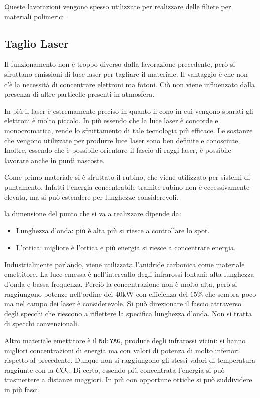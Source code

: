Queste lavorazioni vengono spesso utilizzate per realizzare delle filiere per materiali polimerici.

\subsection{Taglio Laser}
Il funzionamento non è troppo diverso dalla lavorazione precedente, però si sfruttano emissioni di luce laser per tagliare il materiale.
Il vantaggio è che non c'è la necessità di concentrare elettroni ma fotoni.
Ciò non viene influenzato dalla presenza di altre particelle presenti in atmosfera.

In più il laser è estremamente preciso in quanto il cono in cui vengono sparati gli elettroni è molto piccolo.
In più essendo che la luce laser è concorde e monocromatica, rende lo sfruttamento di tale tecnologia più efficace.
Le sostanze che vengono utilizzate per produrre luce laser sono ben definite e conosciute.
Inoltre, essendo che è possibile orientare il fascio di raggi laser, è possibile lavorare anche in punti nascoste.

Come primo materiale si è sfruttato il rubino, che viene utilizzato per sistemi di puntamento. Infatti l'energia concentrabile tramite rubino non è eccessivamente elevata, ma si può estendere per lunghezze considerevoli.

la dimensione del punto che si va a realizzare dipende da:
\begin{itemize}
\item Lunghezza d'onda: più è alta più si riesce a controllare lo spot.
\item L'ottica: migliore è l'ottica e più energia si riesce a concentrare energia.
\end{itemize}
Industrialmente parlando, viene utilizzata l'anidride carbonica come materiale emettitore. La luce emessa è nell'intervallo degli infrarossi lontani: alta lunghezza d'onda e bassa frequenza.
Perciò la concentrazione non è molto alta, però si raggiungono potenze nell'ordine dei $40\unit{\kW}$ con efficienza del $15\%$ che sembra poco ma nel campo dei laser è considerevole.
Si può direzionare il fascio attraverso degli specchi che riescono a riflettere la specifica lunghezza d'onda. Non si tratta di specchi convenzionali.

Altro materiale emettitore è il \texttt{Nd:YAG}, produce degli infrarossi vicini: si hanno migliori concentrazioni di energia ma con valori di potenza di molto inferiori rispetto al precedente. Dunque non si raggiungono gli stessi valori di temperatura raggiunte con la $CO_2$.
Di certo, essendo più concentrata l'energia si può trasmettere a distanze maggiori. In più con opportune ottiche si può suddividere in più fasci.

